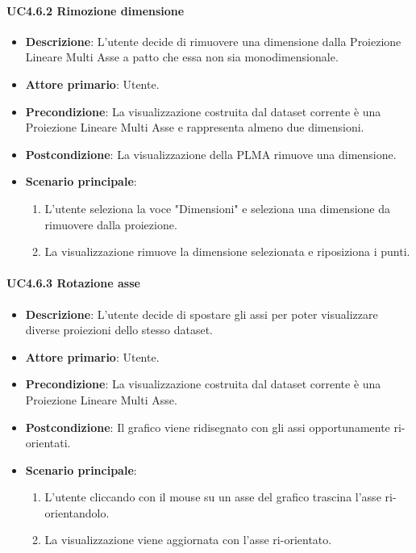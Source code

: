 \paragraph{UC4.6.2 Rimozione dimensione}
\label{par:uc4.6.2}
\begin{itemize}
    \item \textbf{Descrizione}: L’utente decide di rimuovere una dimensione dalla Proiezione Lineare Multi Asse
                                a patto che essa non sia monodimensionale.

    \item \textbf{Attore primario}: Utente.
    
    \item \textbf{Precondizione}:   La visualizzazione costruita dal dataset corrente è una Proiezione Lineare Multi Asse
                                    e rappresenta almeno due dimensioni.
    \item \textbf{Postcondizione}:  La visualizzazione della PLMA rimuove una dimensione.

	\item \textbf{Scenario principale}:
        \begin{enumerate}
            \item L'utente seleziona la voce "Dimensioni" e seleziona una dimensione da rimuovere dalla proiezione.
            \item La visualizzazione rimuove la dimensione selezionata e riposiziona i punti.
           
        \end{enumerate}
\end{itemize}

\paragraph{UC4.6.3 Rotazione asse}
\label{par:uc4.6.3}
\begin{itemize}
    \item \textbf{Descrizione}: L'utente decide di spostare gli assi per poter visualizzare diverse proiezioni dello stesso dataset.
    \item \textbf{Attore primario}: Utente.
    \item \textbf{Precondizione}: La visualizzazione costruita dal dataset corrente è una Proiezione Lineare Multi Asse.
    \item \textbf{Postcondizione}: Il grafico viene ridisegnato con gli assi opportunamente ri-orientati.
    \item \textbf{Scenario principale}:
    \begin{enumerate}
        \item L'utente cliccando con il mouse su un asse del grafico trascina l'asse ri-orientandolo.
	\item La visualizzazione viene aggiornata con l'asse ri-orientato.
    \end{enumerate}
\end{itemize}


